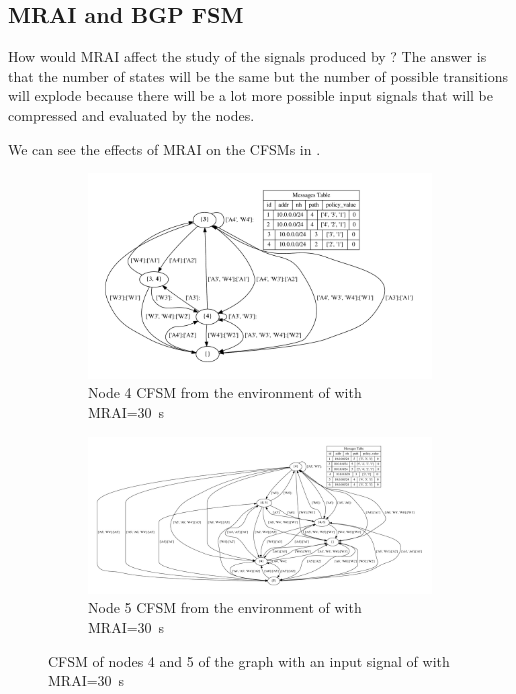 \subsection{MRAI and BGP FSM}
\label{subsec:mrai_vs_bgpfsm}

How would \ac{MRAI} affect the study of the signals produced by ?
The answer is that the number of states will be the same but the number of possible
transitions will explode because there will be a lot more possible
input signals that will be compressed and evaluated by the nodes.

We can see the effects of \ac{MRAI} on the \ac{CFSM}s in .

\begin{figure}[h]
     \centering
     \begin{subfigure}[b]{0.45\textwidth}
         \centering
         \includegraphics[width=\textwidth]{images/fsm/fig_4_4_MRAI30.pdf}
		 \caption{Node \num{4} \ac{CFSM} from the environment of  with \ac{MRAI}=\SI{30}{\second}}
         \label{fig:fsm_node4_MRAI}
     \end{subfigure}
     \hfill
     \begin{subfigure}[b]{0.45\textwidth}
         \centering
         \includegraphics[width=\textwidth]{images/fsm/fig_4_5_MRAI30.pdf}
		 \caption{Node \num{5} \ac{CFSM} from the environment of  with \ac{MRAI}=\SI{30}{\second}}
         \label{fig:fsm_node5_MRAI}
     \end{subfigure}
		\caption{\ac{CFSM} of nodes \num{4} and \num{5} of the graph 
			 with an input signal of  with
			\ac{MRAI}=\SI{30}{\second}}
        \label{fig:fsm_griffin_fig4_MRAI}
\end{figure}

